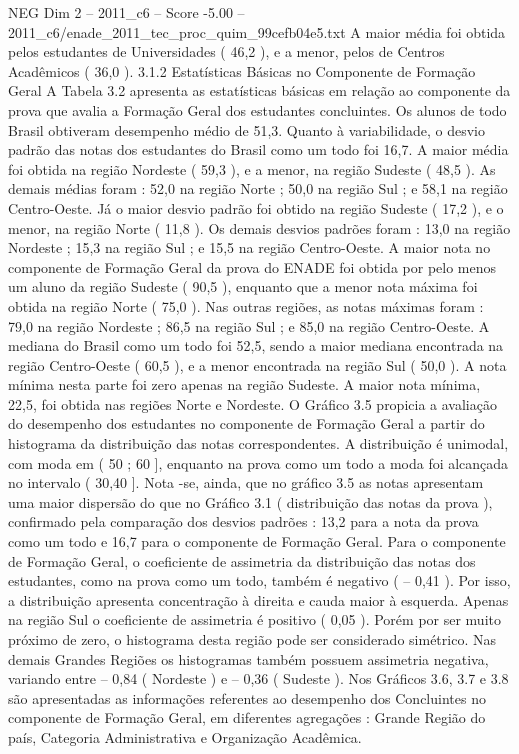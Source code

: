 \begin{textsample}{NEG Dim 2 – 2011\_c6 – Score -5.00 – 2011\_c6/enade\_2011\_tec\_proc\_quim\_99cefb04e5.txt}
A maior média foi obtida pelos estudantes de Universidades ( 46,2 ), e a menor, pelos de Centros Acadêmicos ( 36,0 ). 3.1.2 Estatísticas Básicas no Componente de Formação Geral A Tabela 3.2 apresenta as estatísticas básicas em relação ao componente da prova que avalia a Formação Geral dos estudantes concluintes.
Os alunos de todo Brasil obtiveram desempenho médio de 51,3.
Quanto à variabilidade, o desvio padrão das notas dos estudantes do Brasil como um todo foi 16,7.
A maior média foi obtida na região Nordeste ( 59,3 ), e a menor, na região Sudeste ( 48,5 ).
As demais médias foram : 52,0 na região Norte ; 50,0 na região Sul ; e 58,1 na região Centro-Oeste.
Já o maior desvio padrão foi obtido na região Sudeste ( 17,2 ), e o menor, na região Norte ( 11,8 ).
Os demais desvios padrões foram : 13,0 na região Nordeste ; 15,3 na região Sul ; e 15,5 na região Centro-Oeste.
A maior nota no componente de Formação Geral da prova do ENADE foi obtida por pelo menos um aluno da região Sudeste ( 90,5 ), enquanto que a menor nota máxima foi obtida na região Norte ( 75,0 ).
Nas outras regiões, as notas máximas foram : 79,0 na região Nordeste ; 86,5 na região Sul ; e 85,0 na região Centro-Oeste.
A mediana do Brasil como um todo foi 52,5, sendo a maior mediana encontrada na região Centro-Oeste ( 60,5 ), e a menor encontrada na região Sul ( 50,0 ).
A nota mínima nesta parte foi zero apenas na região Sudeste.
A maior nota mínima, 22,5, foi obtida nas regiões Norte e Nordeste.
O Gráfico 3.5 propicia a avaliação do desempenho dos estudantes no componente de Formação Geral a partir do histograma da distribuição das notas correspondentes.
A distribuição é unimodal, com moda em ( 50 ; 60 ], enquanto na prova como um todo a moda foi alcançada no intervalo ( 30,40 ].
Nota -se, ainda, que no gráfico 3.5 as notas apresentam uma maior dispersão do que no Gráfico 3.1 ( distribuição das notas da prova ), confirmado pela comparação dos desvios padrões : 13,2 para a nota da prova como um todo e 16,7 para o componente de Formação Geral.
Para o componente de Formação Geral, o coeficiente de assimetria da distribuição das notas dos estudantes, como na prova como um todo, também é negativo ( – 0,41 ).
Por isso, a distribuição apresenta concentração à direita e cauda maior à esquerda.
Apenas na região Sul o coeficiente de assimetria é positivo ( 0,05 ).
Porém por ser muito próximo de zero, o histograma desta região pode ser considerado simétrico.
Nas demais Grandes Regiões os histogramas também possuem assimetria negativa, variando entre – 0,84 ( Nordeste ) e – 0,36 ( Sudeste ).
Nos Gráficos 3.6, 3.7 e 3.8 são apresentadas as informações referentes ao desempenho dos Concluintes no componente de Formação Geral, em diferentes agregações : Grande Região do país, Categoria Administrativa e Organização Acadêmica.

\end{textsample}
